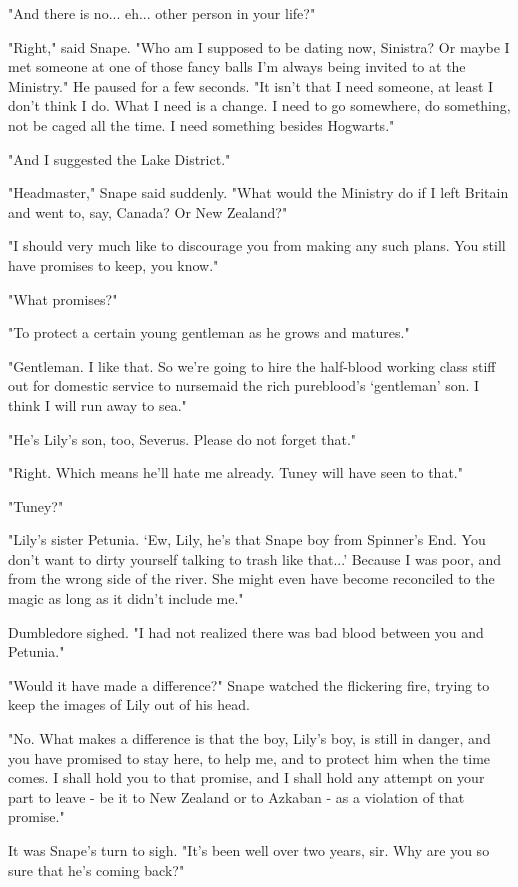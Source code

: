 \documentclass[a4paper,11pt]{article}
\begin{document}
"And there is no... eh... other person in your life?"

"Right," said Snape. "Who am I supposed to be dating now, Sinistra? Or maybe I met someone at one of those fancy balls I'm always being invited to at the Ministry." He paused for a few seconds. "It isn't that I need someone, at least I don't think I do. What I need is a change. I need to go somewhere, do something, not be caged all the time. I need something besides Hogwarts."

"And I suggested the Lake District."

"Headmaster," Snape said suddenly. "What would the Ministry do if I left Britain and went to, say, Canada? Or New Zealand?"

"I should very much like to discourage you from making any such plans. You still have promises to keep, you know."

"What promises?"

"To protect a certain young gentleman as he grows and matures."

"Gentleman. I like that. So we're going to hire the half-blood working class stiff out for domestic service to nursemaid the rich pureblood's `gentleman' son. I think I will run away to sea."

"He's Lily's son, too, Severus. Please do not forget that."

"Right. Which means he'll hate me already. Tuney will have seen to that."

"Tuney?"

"Lily's sister Petunia. `Ew, Lily, he's that Snape boy from Spinner's End. You don't want to dirty yourself talking to trash like that...' Because I was poor, and from the wrong side of the river. She might even have become reconciled to the magic as long as it didn't include me."

Dumbledore sighed. "I had not realized there was bad blood between you and Petunia."

"Would it have made a difference?" Snape watched the flickering fire, trying to keep the images of Lily out of his head.

"No. What makes a difference is that the boy, Lily's boy, is still in danger, and you have promised to stay here, to help me, and to protect him when the time comes. I shall hold you to that promise, and I shall hold any attempt on your part to leave - be it to New Zealand or to Azkaban - as a violation of that promise."

It was Snape's turn to sigh. "It's been well over two years, sir. Why are you so sure that he's coming back?"
\end{document}
